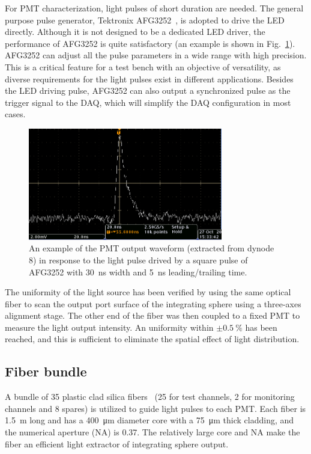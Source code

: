\documentclass{nst}
\providecommand{\DIFadd}[1]{{\protect\color{yellow} #1}} %
\providecommand{\DIFaddbegin}{} %
\providecommand{\DIFaddend}{} %
\providecommand{\DIFdelbegin}{} %
\providecommand{\DIFdelend}{} %
\begin{document}
For PMT characterization, light pulses of short duration are needed.
The general purpose pulse generator, Tektronix AFG3252~\cite{afg3252}, is adopted to drive the LED directly.
Although it is not designed to be a dedicated LED driver, the performance of AFG3252 is quite satisfactory (an example is shown in Fig.~\ref{fig:FIG4}).
AFG3252 can adjust all the pulse parameters in a wide range with high precision. This is a critical feature for a test bench with an objective of versatility, as diverse requirements for the light pulses exist in different applications. 
Besides the LED driving pulse, AFG3252 can also output a synchronized pulse as the trigger signal to the DAQ, which will simplify the DAQ configuration in most cases. 

\begin{figure}[!htb]
	\centering
	\includegraphics[width=85mm]{FIG4.jpg}
	\caption{An example of the PMT output waveform (extracted from dynode 8) in response to the light pulse drived by a square pulse of AFG3252 with \SI{30}{\nano\second} width and \SI{5}{\nano\second} leading/trailing time.}
	\label{fig:FIG4}
\end{figure} 

The uniformity of the light source has been verified by using the same optical fiber to scan the output port surface of the integrating sphere using a three-axes alignment stage. The other end of the fiber was then coupled to a fixed PMT to measure the light output intensity.
An uniformity within $\pm\SI{0.5}{\percent}$ has been reached, and this is sufficient to eliminate the spatial effect of light distribution.

\subsection{Fiber bundle}
\label{sec:fiber_bundle}

A bundle of 35 plastic clad silica fibers~\cite{optical_fibre} (25 for test channels, 2 for monitoring channels and 8 spares) is utilized to \DIFdelbegin \DIFdelend \DIFaddbegin \DIFadd{guide }\DIFaddend light pulses to each PMT.	Each fiber is \SI{1.5}{\meter} long and has a \SI{400}{\micro\meter} diameter core with a \SI{75}{\micro\meter} thick cladding, and the numerical aperture (NA) is 0.37.
The relatively large core and NA make the fiber an efficient light extractor of integrating sphere output. 
\end{document}
